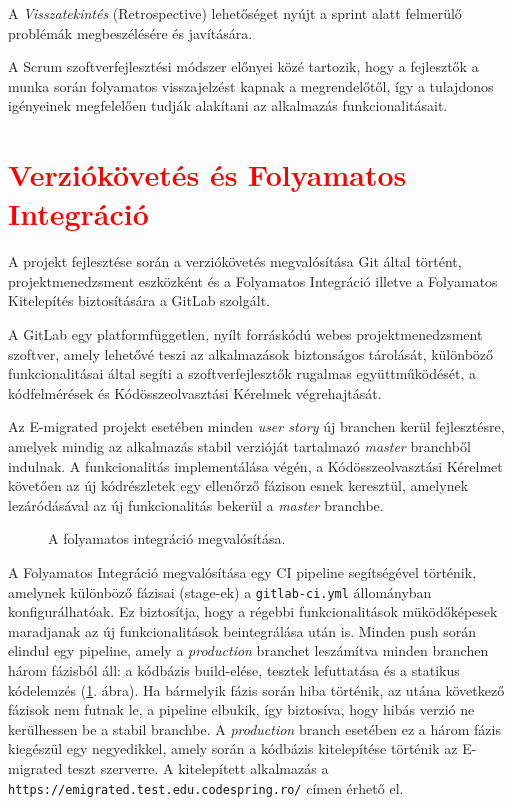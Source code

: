 A \textit{Visszatekintés} (Retrospective) lehetőséget nyújt a sprint alatt felmerülő problémák megbeszélésére és javítására.

A Scrum szoftverfejlesztési módszer előnyei közé tartozik, hogy a fejlesztők a munka során folyamatos visszajelzést kapnak a megrendelőtől, így a tulajdonos igényeinek megfelelően tudják alakítani az alkalmazás funkcionalitásait.

\section{\textcolor{red}{Verziókövetés és Folyamatos Integráció}}
A projekt fejlesztése során a verziókövetés megvalósítása Git által történt, projektmenedzsment eszközként és a Folyamatos Integráció  \cite{CI} illetve a Folyamatos Kitelepítés \cite{CD}  biztosítására a GitLab szolgált. 

A GitLab egy platformfüggetlen, nyílt forráskódú webes projektmenedzsment szoftver, amely lehetővé teszi az alkalmazások biztonságos tárolását, különböző funkcionalitásai által segíti a szoftverfejlesztők rugalmas együttműködését, a kódfelmérések és Kódösszeolvasztási Kérelmek  végrehajtását. 

Az E-migrated projekt esetében minden \textit{user story} új branchen kerül fejlesztésre, amelyek mindig az alkalmazás stabil verzióját tartalmazó \textit{master} branchből indulnak. A funkcionalitás implementálása végén, a Kódösszeolvasztási Kérelmet követően az új kódrészletek egy ellenőrző fázison esnek keresztül, amelynek lezáródásával az új funkcionalitás bekerül a \textit{master} branchbe. 
\begin{figure}[!b]
  \centering
  \caption{A folyamatos integráció megvalósítása. }
  \label{fig:continuous_integration}
\end{figure}

A Folyamatos Integráció megvalósítása egy CI pipeline segítségével történik, amelynek különböző fázisai (stage-ek) a \texttt{gitlab-ci.yml} állományban  konfigurálhatóak. Ez biztosítja, hogy a régebbi funkcionalitások müködőképesek maradjanak az új funkcionalitások beintegrálása után is. Minden push során elindul egy pipeline, amely a \textit{production} branchet leszámítva minden branchen három fázisból áll: a kódbázis build-elése, tesztek lefuttatása és a statikus kódelemzés (\ref{fig:continuous_integration}. ábra). Ha bármelyik fázis során hiba történik, az utána következő fázisok nem futnak le, a pipeline elbukik, így biztosíva, hogy hibás verzió ne kerülhessen be a stabil branchbe. A \textit{production} branch esetében ez a három fázis kiegészül egy negyedikkel, amely során a kódbázis kitelepítése történik az E-migrated teszt szerverre. A kitelepített alkalmazás a \texttt{https://emigrated.test.edu.codespring.ro/} címen érhető el. 



